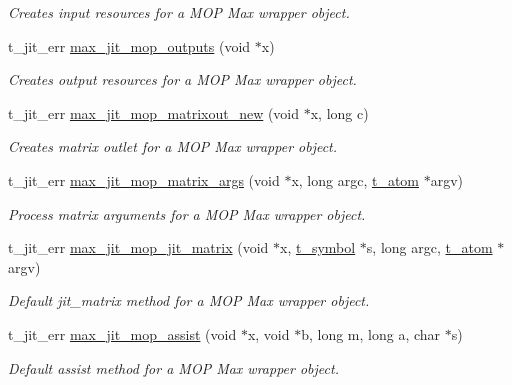 \begin{DoxyCompactItemize}
\begin{DoxyCompactList}\small\item\em Creates input resources for a MOP Max wrapper object. \item\end{DoxyCompactList}\item 
t\_\-jit\_\-err \hyperlink{group__maxmopmod_ga07f044bc4c7fe4380f31e150844948df}{max\_\-jit\_\-mop\_\-outputs} (void $\ast$x)
\begin{DoxyCompactList}\small\item\em Creates output resources for a MOP Max wrapper object. \item\end{DoxyCompactList}\item 
t\_\-jit\_\-err \hyperlink{group__maxmopmod_gade858d795f0afefa64a28acbb110f0a6}{max\_\-jit\_\-mop\_\-matrixout\_\-new} (void $\ast$x, long c)
\begin{DoxyCompactList}\small\item\em Creates matrix outlet for a MOP Max wrapper object. \item\end{DoxyCompactList}\item 
t\_\-jit\_\-err \hyperlink{group__maxmopmod_ga75f7f306602775484eaa1b3f9d3998f3}{max\_\-jit\_\-mop\_\-matrix\_\-args} (void $\ast$x, long argc, \hyperlink{structt__atom}{t\_\-atom} $\ast$argv)
\begin{DoxyCompactList}\small\item\em Process matrix arguments for a MOP Max wrapper object. \item\end{DoxyCompactList}\item 
t\_\-jit\_\-err \hyperlink{group__maxmopmod_gaf2aa6f991436199827afe1f934ec9150}{max\_\-jit\_\-mop\_\-jit\_\-matrix} (void $\ast$x, \hyperlink{structt__symbol}{t\_\-symbol} $\ast$s, long argc, \hyperlink{structt__atom}{t\_\-atom} $\ast$argv)
\begin{DoxyCompactList}\small\item\em Default jit\_\-matrix method for a MOP Max wrapper object. \item\end{DoxyCompactList}\item 
t\_\-jit\_\-err \hyperlink{group__maxmopmod_gaf8a46feb31b44f110ed1dee18338e52f}{max\_\-jit\_\-mop\_\-assist} (void $\ast$x, void $\ast$b, long m, long a, char $\ast$s)
\begin{DoxyCompactList}\small\item\em Default assist method for a MOP Max wrapper object. \item\end{DoxyCompactList}\item 

\end{DoxyCompactItemize}
